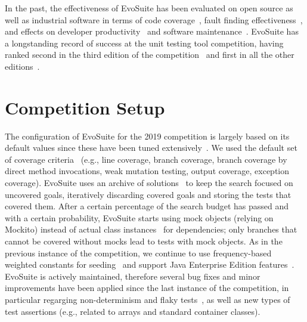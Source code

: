 \documentclass[sigconf,table]{acmart}
\newcommand{\TODO}[1]{\textbf{\textcolor{ScarletRed}{[TODO: #1]}}\xspace}
\newcommand{\TODO}[1]{}
\newcommand{\EVOSUITE}{{\sc EvoSuite}\xspace}
\begin{document}
In the past, the effectiveness of \EVOSUITE has been evaluated on open
source as well as industrial software in terms of code
coverage~\cite{fraser2014large,emse_archive,ea_evaluation,dynamosa},
fault finding
effectiveness~\cite{shamshiri2015automatically,moein2017}, and effects
on developer productivity~\cite{TOSEM_userstudy,ISSTA15_Study} and
software maintenance~\cite{ICST2018_Maintenance}.
%
\EVOSUITE has a longstanding record of success at the unit testing
tool competition, having ranked second in the third edition of the
competition~\cite{evosuiteAtSbst2015} and first in all the other
editions~\cite{evosuiteAtSbst2013,evosuiteAtFittest2013,evosuiteAtSbst2016,evosuiteAtSbst2017,evosuiteAtSbst2018}.




\section{Competition Setup}

The configuration of \EVOSUITE for the 2019 competition is largely
based on its default values since these have been tuned
extensively~\cite{arcuri2013parameter}. We used the default set of
coverage criteria~\cite{rojas2015combining} (e.g., line coverage,
branch coverage, branch coverage by direct method invocations, weak
mutation testing, output coverage, exception coverage). \EVOSUITE uses
an archive of solutions~\cite{emse_archive} to keep the search focused
on uncovered goals, iteratively discarding covered goals and storing
the tests that covered them. After a certain percentage of the search
budget has passed and with a certain probability, \EVOSUITE starts
using mock objects (relying on Mockito) instead of actual class
instances~\cite{ICST_Mocking17} for dependencies; only branches that
cannot be covered without mocks lead to tests with mock objects. As in
the previous instance of the competition, we continue to use
frequency-based weighted constants for
seeding~\cite{sakti2015instance} and support Java Enterprise Edition
features~\cite{arcuri2016java}. %
\EVOSUITE is actively maintained, therefore several bug fixes and
minor improvements have been applied since the last instance of the
competition, in particular regarging non-determinism and flaky
tests~\cite{arcuri2014automated}, as well as new types of test
assertions (e.g., related to arrays and standard container classes).
\end{document}
